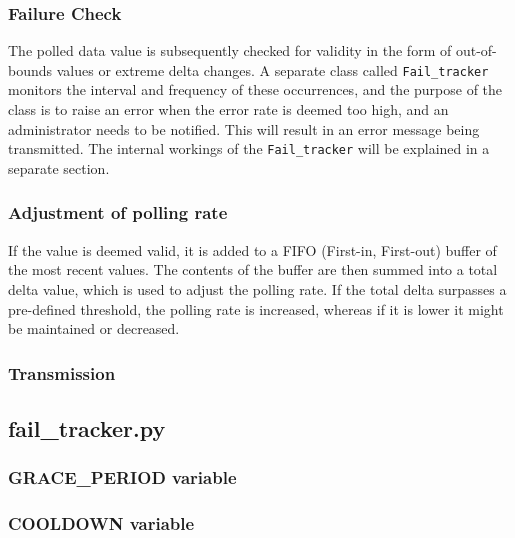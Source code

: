 \subsubsection{Failure Check}
The polled data value is subsequently checked for validity in the form of out-of-bounds values or extreme delta changes. A separate class called \lstinline{Fail_tracker} monitors the interval and frequency of these occurrences, and the purpose of the class is to raise an error when the error rate is deemed too high, and an administrator needs to be notified. This will result in an error message being transmitted. The internal workings of the \lstinline{Fail_tracker} will be explained in a separate section.

\subsubsection{Adjustment of polling rate}
If the value is deemed valid, it is added to a FIFO (First-in, First-out) buffer of the most recent values. The contents of the buffer are then summed into a total delta value, which is used to adjust the polling rate. If the total delta surpasses a pre-defined threshold, the polling rate is increased, whereas if it is lower it might be maintained or decreased.

\subsubsection{Transmission}

\subsection{fail\_tracker.py}

\subsubsection{GRACE\_PERIOD variable}

\subsubsection{COOLDOWN variable}


